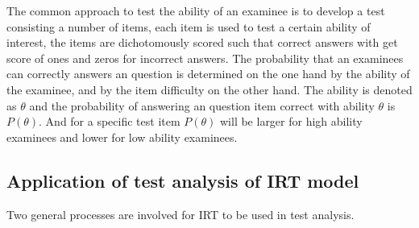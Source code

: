 \documentclass[a4paper]{article}
\begin{document}
The common approach to test the ability of an examinee is to develop a test consisting a number of items, each item is used to test a certain ability of interest, the items are dichotomously scored such that correct answers with get score of ones and zeros for incorrect answers. The probability that an examinees can correctly answers an question is determined on the one hand by the ability of the examinee, and by the item difficulty on the other hand. The ability is denoted as $\theta$ and the probability of answering an question item correct with ability $\theta$ is $P(\theta)$. And for a specific test item $P(\theta)$ will be larger for high ability examinees and lower for low ability examinees.

\subsection{Application of test analysis of IRT model}
Two general processes are involved for IRT to be used in test analysis.
\end{document}
